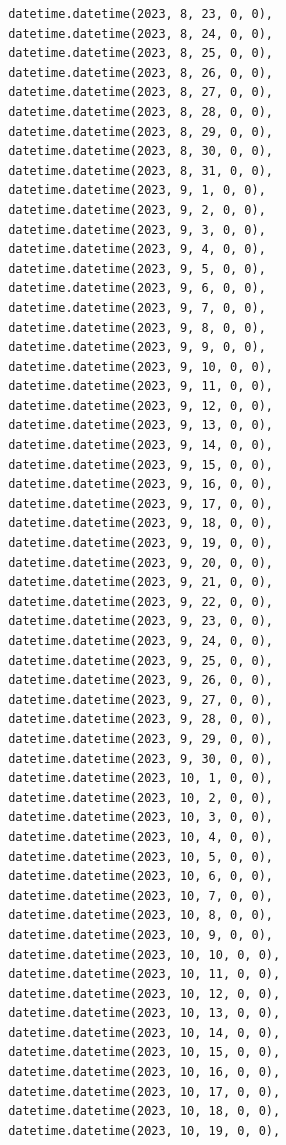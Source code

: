 \documentclass[
  letterpaper,
  DIV=11,
  numbers=noendperiod,
  oneside]{scrreprt}
\begin{document}
\begin{verbatim}
       datetime.datetime(2023, 8, 23, 0, 0),
       datetime.datetime(2023, 8, 24, 0, 0),
       datetime.datetime(2023, 8, 25, 0, 0),
       datetime.datetime(2023, 8, 26, 0, 0),
       datetime.datetime(2023, 8, 27, 0, 0),
       datetime.datetime(2023, 8, 28, 0, 0),
       datetime.datetime(2023, 8, 29, 0, 0),
       datetime.datetime(2023, 8, 30, 0, 0),
       datetime.datetime(2023, 8, 31, 0, 0),
       datetime.datetime(2023, 9, 1, 0, 0),
       datetime.datetime(2023, 9, 2, 0, 0),
       datetime.datetime(2023, 9, 3, 0, 0),
       datetime.datetime(2023, 9, 4, 0, 0),
       datetime.datetime(2023, 9, 5, 0, 0),
       datetime.datetime(2023, 9, 6, 0, 0),
       datetime.datetime(2023, 9, 7, 0, 0),
       datetime.datetime(2023, 9, 8, 0, 0),
       datetime.datetime(2023, 9, 9, 0, 0),
       datetime.datetime(2023, 9, 10, 0, 0),
       datetime.datetime(2023, 9, 11, 0, 0),
       datetime.datetime(2023, 9, 12, 0, 0),
       datetime.datetime(2023, 9, 13, 0, 0),
       datetime.datetime(2023, 9, 14, 0, 0),
       datetime.datetime(2023, 9, 15, 0, 0),
       datetime.datetime(2023, 9, 16, 0, 0),
       datetime.datetime(2023, 9, 17, 0, 0),
       datetime.datetime(2023, 9, 18, 0, 0),
       datetime.datetime(2023, 9, 19, 0, 0),
       datetime.datetime(2023, 9, 20, 0, 0),
       datetime.datetime(2023, 9, 21, 0, 0),
       datetime.datetime(2023, 9, 22, 0, 0),
       datetime.datetime(2023, 9, 23, 0, 0),
       datetime.datetime(2023, 9, 24, 0, 0),
       datetime.datetime(2023, 9, 25, 0, 0),
       datetime.datetime(2023, 9, 26, 0, 0),
       datetime.datetime(2023, 9, 27, 0, 0),
       datetime.datetime(2023, 9, 28, 0, 0),
       datetime.datetime(2023, 9, 29, 0, 0),
       datetime.datetime(2023, 9, 30, 0, 0),
       datetime.datetime(2023, 10, 1, 0, 0),
       datetime.datetime(2023, 10, 2, 0, 0),
       datetime.datetime(2023, 10, 3, 0, 0),
       datetime.datetime(2023, 10, 4, 0, 0),
       datetime.datetime(2023, 10, 5, 0, 0),
       datetime.datetime(2023, 10, 6, 0, 0),
       datetime.datetime(2023, 10, 7, 0, 0),
       datetime.datetime(2023, 10, 8, 0, 0),
       datetime.datetime(2023, 10, 9, 0, 0),
       datetime.datetime(2023, 10, 10, 0, 0),
       datetime.datetime(2023, 10, 11, 0, 0),
       datetime.datetime(2023, 10, 12, 0, 0),
       datetime.datetime(2023, 10, 13, 0, 0),
       datetime.datetime(2023, 10, 14, 0, 0),
       datetime.datetime(2023, 10, 15, 0, 0),
       datetime.datetime(2023, 10, 16, 0, 0),
       datetime.datetime(2023, 10, 17, 0, 0),
       datetime.datetime(2023, 10, 18, 0, 0),
       datetime.datetime(2023, 10, 19, 0, 0),

\end{verbatim}
\end{document}
